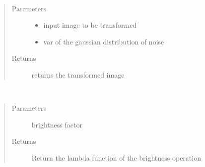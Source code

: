\documentclass[letterpaper,10pt,english]{sphinxmanual}
\begin{document}
\begin{fulllineitems}
\label{\detokenize{ida_lib.operations:ida_lib.operations.pixel_ops_functional.gaussian_noise}}~\begin{quote}\begin{description}
\item[{Parameters}] \leavevmode\begin{itemize}
\item {} 
 \textendash{} input image to be transformed

\item {} 
 \textendash{} var of the gaussian distribution of noise

\end{itemize}

\item[{Returns}] \leavevmode
returns the transformed image

\end{description}\end{quote}

\end{fulllineitems}


\begin{fulllineitems}
\label{\detokenize{ida_lib.operations:ida_lib.operations.pixel_ops_functional.get_brightness_function}}~\begin{quote}\begin{description}
\item[{Parameters}] \leavevmode
{} \textendash{} brightness factor

\item[{Returns}] \leavevmode
Return the lambda function of the brightness operation

\end{description}\end{quote}

\end{fulllineitems}
\end{document}
